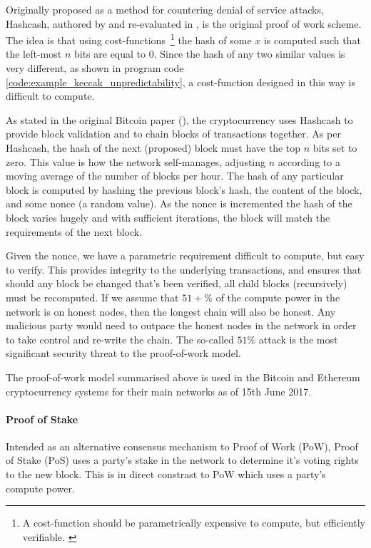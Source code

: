Originally proposed as a method for countering denial of service attacks, Hashcash, authored by \cite{hashcash:1997:misc} and re-evaluated in \cite{hashcash:2002:misc}, is the original proof of work scheme. The idea is that using cost-functions~\footnote{A cost-function should be parametrically expensive to compute, but efficiently verifiable. \cite{hashcash:2002:misc}} the hash of some $x$ is computed such that the left-most $n$ bits are equal to $0$. Since the hash of any two similar values is very different, as shown in program code \ref{code:example_keccak_unpredictability}, a cost-function designed in this way is difficult to compute.



As stated in the original Bitcoin paper (\cite{bitcoin:2008:misc}), the cryptocurrency uses Hashcash to provide block validation and to chain blocks of transactions together. As per Hashcash, the hash of the next (proposed) block must have the top $n$ bits set to zero. This value is how the network self-manages, adjusting $n$ according to a moving average of the number of blocks per hour. The hash of any particular block is computed by hashing the previous block's hash, the content of the block, and some nonce (a random value). As the nonce is incremented the hash of the block varies hugely and with sufficient iterations, the block will match the requirements of the next block.

Given the nonce, we have a parametric requirement difficult to compute, but easy to verify. This provides integrity to the underlying transactions, and ensures that should any block be changed that's been verified, all child blocks (recursively) must be recomputed. If we assume that $51+\%$ of the compute power in the network is on honest nodes, then the longest chain will also be honest. Any malicious party would need to outpace the honest nodes in the network in order to take control and re-write the chain. The so-called $51\%$ attack is the most significant security threat to the proof-of-work model.

The proof-of-work model summarised above is used in the Bitcoin and Ethereum cryptocurrency systems for their main networks as of 15th June 2017.

\paragraph{Proof of Stake}

Intended as an alternative consensus mechanism to Proof of Work (PoW), Proof of Stake (PoS) uses a party's stake in the network to determine it's voting rights to the new block. This is in direct constrast to PoW which uses a party's compute power.

